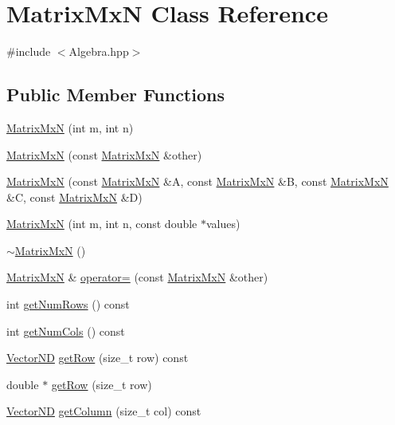 \hypertarget{class_matrix_mx_n}{\section{Matrix\-Mx\-N Class Reference}
\label{class_matrix_mx_n}
}


{\ttfamily \#include $<$Algebra.\-hpp$>$}

\subsection*{Public Member Functions}
\begin{DoxyCompactItemize}
\item 
\hyperlink{class_matrix_mx_n_aa26c1f54476e80bd693e1539b8927453}{Matrix\-Mx\-N} (int m, int n)
\item 
\hyperlink{class_matrix_mx_n_a51772c3c29de4b2de1cfe0b8127343a9}{Matrix\-Mx\-N} (const \hyperlink{class_matrix_mx_n}{Matrix\-Mx\-N} \&other)
\item 
\hyperlink{class_matrix_mx_n_a10eae021475aec1f150f76bd902971f6}{Matrix\-Mx\-N} (const \hyperlink{class_matrix_mx_n}{Matrix\-Mx\-N} \&A, const \hyperlink{class_matrix_mx_n}{Matrix\-Mx\-N} \&B, const \hyperlink{class_matrix_mx_n}{Matrix\-Mx\-N} \&C, const \hyperlink{class_matrix_mx_n}{Matrix\-Mx\-N} \&D)
\item 
\hyperlink{class_matrix_mx_n_a2043e4fe83a99250f8cf9558a2fa2494}{Matrix\-Mx\-N} (int m, int n, const double $\ast$values)
\item 
\hyperlink{class_matrix_mx_n_a7ca69d25d1b478744e051ed1610ba6a6}{$\sim$\-Matrix\-Mx\-N} ()
\item 
\hyperlink{class_matrix_mx_n}{Matrix\-Mx\-N} \& \hyperlink{class_matrix_mx_n_aed6d9329b641e215fdb2ef9941ba7f43}{operator=} (const \hyperlink{class_matrix_mx_n}{Matrix\-Mx\-N} \&other)
\item 
int \hyperlink{class_matrix_mx_n_a1042a2d48ffa37b7d002ec84857b8cb0}{get\-Num\-Rows} () const 
\item 
int \hyperlink{class_matrix_mx_n_a32a4754dc06976e18968deabdf3848b7}{get\-Num\-Cols} () const 
\item 
\hyperlink{class_vector_n_d}{Vector\-N\-D} \hyperlink{class_matrix_mx_n_aa87ad967e022efc94f045b15ecf97c59}{get\-Row} (size\-\_\-t row) const 
\item 
double $\ast$ \hyperlink{class_matrix_mx_n_ad629ff9103c428eeb7193a2c09c04d58}{get\-Row} (size\-\_\-t row)
\item 
\hyperlink{class_vector_n_d}{Vector\-N\-D} \hyperlink{class_matrix_mx_n_a1bdc3f79ffb1b5e65a0010fe50ff0168}{get\-Column} (size\-\_\-t col) const 

\end{DoxyCompactItemize}
